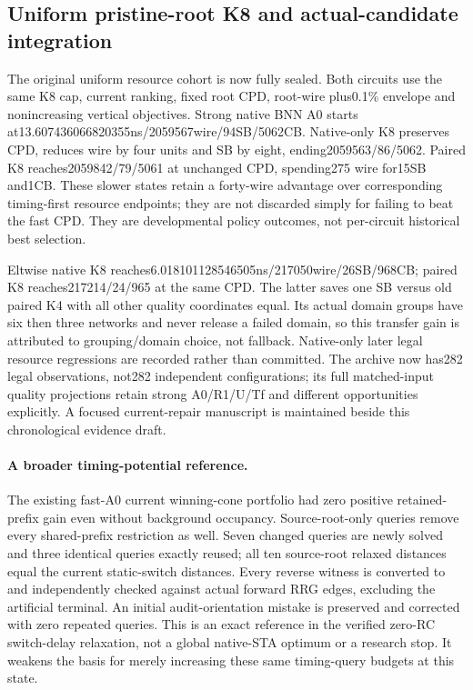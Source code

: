 \subsection{Uniform pristine-root K8 and actual-candidate integration}
The original uniform resource cohort is now fully sealed. Both circuits use the same K8 cap, current ranking, fixed root CPD, root-wire plus0.1\% envelope and nonincreasing vertical objectives. Strong native BNN A0 starts at13.607436066820355ns/2059567wire/94SB/5062CB. Native-only K8 preserves CPD, reduces wire by four units and SB by eight, ending2059563/86/5062. Paired K8 reaches2059842/79/5061 at unchanged CPD, spending275 wire for15SB and1CB. These slower states retain a forty-wire advantage over corresponding timing-first resource endpoints; they are not discarded simply for failing to beat the fast CPD. They are developmental policy outcomes, not per-circuit historical best selection.

Eltwise native K8 reaches6.018101128546505ns/217050wire/26SB/968CB; paired K8 reaches217214/24/965 at the same CPD. The latter saves one SB versus old paired K4 with all other quality coordinates equal. Its actual domain groups have six then three networks and never release a failed domain, so this transfer gain is attributed to grouping/domain choice, not fallback. Native-only later legal resource regressions are recorded rather than committed. The archive now has282 legal observations, not282 independent configurations; its full matched-input quality projections retain strong A0/R1/U/Tf and different opportunities explicitly. A focused current-repair manuscript is maintained beside this chronological evidence draft.

\paragraph{A broader timing-potential reference.}
The existing fast-A0 current winning-cone portfolio had zero positive retained-prefix gain even without background occupancy. Source-root-only queries remove every shared-prefix restriction as well. Seven changed queries are newly solved and three identical queries exactly reused; all ten source-root relaxed distances equal the current static-switch distances. Every reverse witness is converted to and independently checked against actual forward RRG edges, excluding the artificial terminal. An initial audit-orientation mistake is preserved and corrected with zero repeated queries. This is an exact reference in the verified zero-RC switch-delay relaxation, not a global native-STA optimum or a research stop. It weakens the basis for merely increasing these same timing-query budgets at this state.

